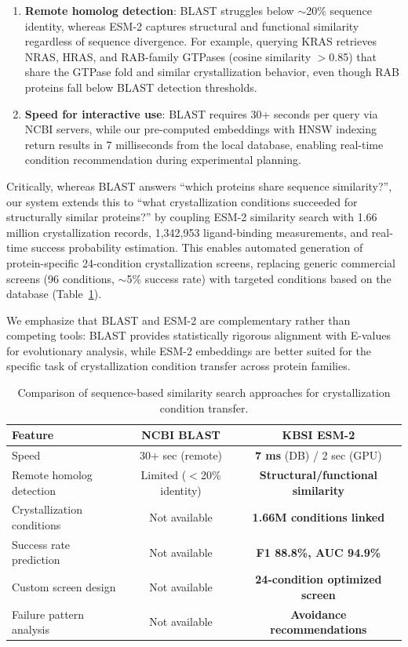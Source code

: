 \documentclass[11pt]{article}
\begin{document}
\begin{enumerate}
  \item \textbf{Remote homolog detection}: BLAST struggles below $\sim$20\% sequence identity, whereas ESM-2 captures structural and functional similarity regardless of sequence divergence. For example, querying KRAS retrieves NRAS, HRAS, and RAB-family GTPases (cosine similarity $>$0.85) that share the GTPase fold and similar crystallization behavior, even though RAB proteins fall below BLAST detection thresholds.
  \item \textbf{Speed for interactive use}: BLAST requires 30+ seconds per query via NCBI servers, while our pre-computed embeddings with HNSW indexing return results in 7 milliseconds from the local database, enabling real-time condition recommendation during experimental planning.
\end{enumerate}

Critically, whereas BLAST answers ``which proteins share sequence similarity?'', our system extends this to ``what crystallization conditions succeeded for structurally similar proteins?'' by coupling ESM-2 similarity search with 1.66 million crystallization records, 1,342,953 ligand-binding measurements, and real-time success probability estimation. This enables automated generation of protein-specific 24-condition crystallization screens, replacing generic commercial screens (96 conditions, $\sim$5\% success rate) with targeted conditions based on the database (Table~\ref{tab:blast_comparison}).

We emphasize that BLAST and ESM-2 are complementary rather than competing tools: BLAST provides statistically rigorous alignment with E-values for evolutionary analysis, while ESM-2 embeddings are better suited for the specific task of crystallization condition transfer across protein families.

\begin{table}[h]
\centering
\small
\caption{Comparison of sequence-based similarity search approaches for crystallization condition transfer.}
\label{tab:blast_comparison}
\begin{tabular}{lcc}
\hline
\textbf{Feature} & \textbf{NCBI BLAST} & \textbf{KBSI ESM-2} \\
\hline
Speed & 30+ sec (remote) & \textbf{7 ms} (DB) / 2 sec (GPU) \\
Remote homolog detection & Limited ($<$20\% identity) & \textbf{Structural/functional similarity} \\
Crystallization conditions & Not available & \textbf{1.66M conditions linked} \\
Success rate prediction & Not available & \textbf{F1 88.8\%, AUC 94.9\%} \\
Custom screen design & Not available & \textbf{24-condition optimized screen} \\
Failure pattern analysis & Not available & \textbf{Avoidance recommendations} \\
\hline
\end{tabular}
\end{table}
\end{document}
